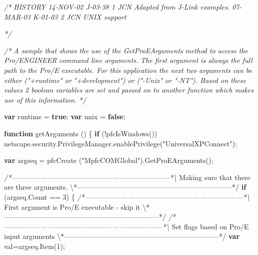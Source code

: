 \documentclass[]{article}
\newenvironment{Shaded}{}{}
\newcommand{\KeywordTok}[1]{\textcolor[rgb]{0.00,0.44,0.13}{\textbf{{#1}}}}
\newcommand{\DecValTok}[1]{\textcolor[rgb]{0.25,0.63,0.44}{{#1}}}
\newcommand{\StringTok}[1]{\textcolor[rgb]{0.25,0.44,0.63}{{#1}}}
\newcommand{\CommentTok}[1]{\textcolor[rgb]{0.38,0.63,0.69}{\textit{{#1}}}}
\newcommand{\OtherTok}[1]{\textcolor[rgb]{0.00,0.44,0.13}{{#1}}}
\newcommand{\FunctionTok}[1]{\textcolor[rgb]{0.02,0.16,0.49}{{#1}}}
\newcommand{\NormalTok}[1]{{#1}}
\begin{document}
\begin{Shaded}
\begin{Highlighting}[]
\CommentTok{/*}
\CommentTok{   HISTORY}
\CommentTok{   }
\CommentTok{14-NOV-02   J-03-38   $$1   JCN      Adapted from J-Link examples.}
\CommentTok{07-MAR-03   K-01-03   $$2   JCN      UNIX support}

\CommentTok{ */}
 
\CommentTok{/* }
\CommentTok{   A sample that shows the use of the GetProEArguments}
\CommentTok{   method to access the Pro/ENGINEER command line arguments. }
\CommentTok{   The first argument is always the full path to the Pro/E executable. }
\CommentTok{   For this application the next two arguments can be either ("+runtime" or }
\CommentTok{   "+development") or ("-Unix" or "-NT"). Based on these values 2 boolean }
\CommentTok{   variables are set and passed on to another function which makes use of }
\CommentTok{   this information.   }
\CommentTok{*/}    

\KeywordTok{var} \NormalTok{runtime = }\KeywordTok{true}\NormalTok{;}
\KeywordTok{var} \NormalTok{unix = }\KeywordTok{false}\NormalTok{;}

\KeywordTok{function} \FunctionTok{getArguments} \NormalTok{()}
\NormalTok{\{}
  \KeywordTok{if} \NormalTok{(!}\FunctionTok{pfcIsWindows}\NormalTok{())}
    \OtherTok{netscape}\NormalTok{.}\OtherTok{security}\NormalTok{.}\OtherTok{PrivilegeManager}\NormalTok{.}\FunctionTok{enablePrivilege}\NormalTok{(}\StringTok{"UniversalXPConnect"}\NormalTok{);}
  
  \KeywordTok{var} \NormalTok{argseq = }\FunctionTok{pfcCreate} \NormalTok{(}\StringTok{"MpfcCOMGlobal"}\NormalTok{).}\FunctionTok{GetProEArguments}\NormalTok{();         }
  
\CommentTok{/*------------------------------------------------------------------*\textbackslash{}}
  \NormalTok{Making sure that there are three }\OtherTok{arguments}\NormalTok{.}
\NormalTok{\textbackslash{}*------------------------------------------------------------------*}\OtherTok{/}
  \KeywordTok{if} \NormalTok{(}\OtherTok{argseq}\NormalTok{.}\FunctionTok{Count} \NormalTok{== }\DecValTok{3}\NormalTok{)}
    \NormalTok{\{}
\CommentTok{/*------------------------------------------------------------------*\textbackslash{}}
  \NormalTok{First argument is Pro/E executable  - skip it}
\NormalTok{\textbackslash{}*------------------------------------------------------------------*}\OtherTok{/}
\CommentTok{/*------------------------------------------------------------------*\textbackslash{}}
  \NormalTok{Set flags based on Pro/E input arguments}
\NormalTok{\textbackslash{}*------------------------------------------------------------------*}\OtherTok{/}
      \KeywordTok{var} \NormalTok{val=}\OtherTok{argseq}\NormalTok{.}\FunctionTok{Item}\NormalTok{(}\DecValTok{1}\NormalTok{);}
      

\end{Highlighting}
\end{Shaded}
\end{document}
